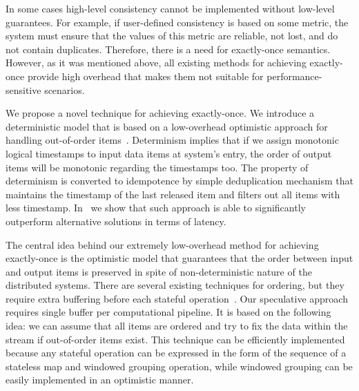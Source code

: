 \label{fs-phd-optimistic}

In some cases high-level consistency cannot be implemented without low-level guarantees. For example, if user-defined consistency is based on some metric, the system must ensure that the values of this metric are reliable, not lost, and do not contain duplicates. Therefore, there is a need for exactly-once semantics. However, as it was mentioned above, all existing methods for achieving exactly-once provide high overhead that makes them not suitable for performance-sensitive scenarios.

We propose a novel technique for achieving exactly-once. We introduce a deterministic model that is based on a low-overhead optimistic approach for handling out-of-order items~\cite{we2018seim}. Determinism implies that if we assign monotonic logical timestamps to input data items at system's entry, the order of output items will be monotonic regarding the timestamps too. The property of determinism is converted to idempotence by simple deduplication mechanism that maintains the timestamp of the last released item and filters out all items with less timestamp. In~\cite{we2018beyondmr} we show that such approach is able to significantly outperform alternative solutions in terms of latency.

The central idea behind our extremely low-overhead method for achieving exactly-once is the optimistic model that guarantees that the order between input and output items is preserved in spite of non-deterministic nature of the distributed systems. There are several existing techniques for ordering, but they require extra buffering before each stateful operation~\cite{Li:2008:OPN:1453856.1453890}. Our speculative approach requires single buffer per computational pipeline. It is based on the following idea: we can assume that all items are ordered and try to fix the data within the stream if out-of-order items exist. This technique can be efficiently implemented because any stateful operation can be expressed in the form of the sequence of a stateless map and windowed grouping operation, while windowed grouping can be easily implemented in an optimistic manner.